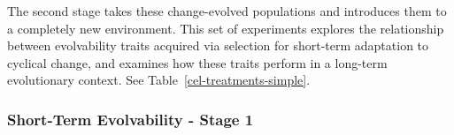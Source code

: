 \documentclass[10pt,letterpaper,final]{article}
\begin{document}
The second stage takes these change-evolved populations and introduces them to a completely new environment. This set of experiments explores the relationship between evolvability traits acquired via selection for short-term adaptation to cyclical change, and examines how these traits perform in a long-term evolutionary context. See Table~\ref{cel-treatments-simple}.








\subsubsection*{Short-Term Evolvability - Stage 1%
}
\end{document}
